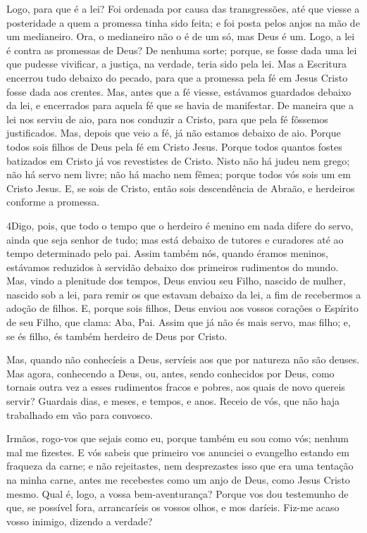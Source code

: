 Logo, para que é a lei? Foi ordenada por causa das transgressões,
até que viesse a posteridade a quem a promessa tinha sido feita; e
foi posta pelos anjos na mão de um medianeiro. Ora, o
medianeiro não o é de um só, mas Deus é um. Logo, a lei é
contra as promessas de Deus? De nenhuma sorte; porque, se fosse dada
uma lei que pudesse vivificar, a justiça, na verdade, teria sido
pela lei. Mas a Escritura encerrou tudo debaixo do pecado,
para que a promessa pela fé em Jesus Cristo fosse dada aos crentes.
Mas, antes que a fé viesse, estávamos guardados debaixo da
lei, e encerrados para aquela fé que se havia de manifestar.
De maneira que a lei nos serviu de aio, para nos conduzir a
Cristo, para que pela fé fôssemos justificados. Mas, depois
que veio a fé, já não estamos debaixo de aio. Porque todos
sois filhos de Deus pela fé em Cristo Jesus. Porque todos
quantos fostes batizados em Cristo já vos revestistes de Cristo.
Nisto não há judeu nem grego; não há servo nem livre; não há
macho nem fêmea; porque todos vós sois um em Cristo Jesus. E,
se sois de Cristo, então sois descendência de Abraão, e herdeiros
conforme a promessa.

\medskip

\lettrine{4} Digo, pois, que todo o tempo que o herdeiro é
menino em nada difere do servo, ainda que seja senhor de tudo;
mas está debaixo de tutores e curadores até ao tempo determinado
pelo pai. Assim também nós, quando éramos meninos, estávamos
reduzidos à servidão debaixo dos primeiros rudimentos do mundo.
Mas, vindo a plenitude dos tempos, Deus enviou seu Filho,
nascido de mulher, nascido sob a lei, para remir os que estavam
debaixo da lei, a fim de recebermos a adoção de filhos. E,
porque sois filhos, Deus enviou aos vossos corações o Espírito de
seu Filho, que clama: Aba, Pai. Assim que já não és mais servo,
mas filho; e, se és filho, és também herdeiro de Deus por Cristo.

Mas, quando não conhecíeis a Deus, servíeis aos que por natureza
não são deuses. Mas agora, conhecendo a Deus, ou, antes, sendo
conhecidos por Deus, como tornais outra vez a esses rudimentos
fracos e pobres, aos quais de novo quereis servir? Guardais
dias, e meses, e tempos, e anos. Receio de vós, que não haja
trabalhado em vão para convosco.

Irmãos, rogo-vos que sejais como eu, porque também eu sou como
vós; nenhum mal me fizestes. E vós sabeis que primeiro vos
anunciei o evangelho estando em fraqueza da carne; e não
rejeitastes, nem desprezastes isso que era uma tentação na minha
carne, antes me recebestes como um anjo de Deus, como Jesus Cristo
mesmo. Qual é, logo, a vossa bem-aventurança? Porque vos dou
testemunho de que, se possível fora, arrancaríeis os vossos olhos, e
mos daríeis. Fiz-me acaso vosso inimigo, dizendo a verdade?

